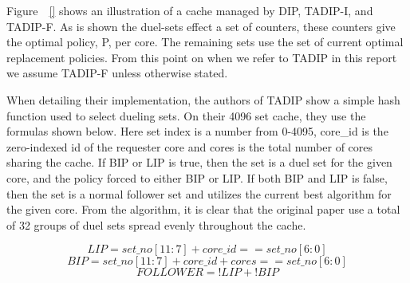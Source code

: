 Figure~\todo{}~\ref{} shows an illustration of a cache managed by DIP, TADIP-I, and TADIP-F. 
As is shown the duel-sets effect a set of counters, these counters give the optimal policy, P, per core. 
The remaining sets use the set of current optimal replacement policies.
From this point on when we refer to TADIP in this report we assume TADIP-F unless otherwise stated.

When detailing their implementation, the authors of TADIP show a simple hash function used to select dueling sets.
On their 4096 set cache, they use the formulas shown below.
Here set index is a number from 0-4095, core\_id is the zero-indexed id of the requester core and cores is the total number of cores sharing the cache.
If BIP or LIP is true, then the set is a duel set for the given core, and the policy forced to either BIP or LIP.
If both BIP and LIP is false, then the set is a normal follower set and utilizes the current best algorithm for the given core.
From the algorithm, it is clear that the original paper use a total of 32 groups of duel sets spread evenly throughout the cache.
\begin{figure*}[ht]
\begin{equation}
LIP = set\_no[11:7] + core\_id == set\_no[6:0]
\end{equation}
\begin{equation}
BIP = set\_no[11:7] + core\_id + cores == set\_no[6:0]
\end{equation}
\begin{equation}
FOLLOWER = !LIP + !BIP
\end{equation}
\end{figure*}

